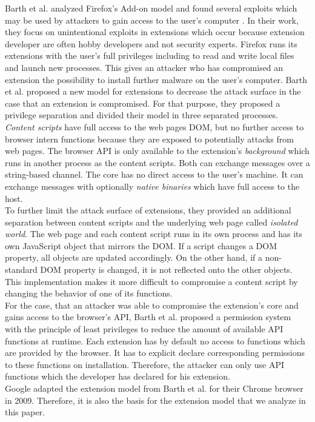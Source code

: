 	Barth et al. analyzed Firefox's Add-on model and found several exploits which may be used by attackers to gain access to the user's computer \cite{Barth10protectingbrowsers}. In their work, they focus on unintentional exploits in extensions which occur because extension developer are often hobby developers and not security experts. Firefox runs its extensions with the user's full privileges including to read and write local files and launch new processes. This gives an attacker who has compromised an extension the possibility to install further malware on the user's computer. Barth et al. proposed a new model for extensions to decrease the attack surface in the case that an extension is compromised. For that purpose, they  proposed a privilege separation and divided their model in three separated processes. \textit{Content scripts} have full access to the web pages DOM, but no further access to browser intern functions because they are exposed to potentially attacks from web pages. The browser API is only available to the extension's \textit{background} which runs in another process as the content scripts. Both can exchange messages over a string-based channel. The core has no direct access to the user's machine. It can exchange messages with optionally \textit{native binaries} which have full access to the host. \\
	To further limit the attack surface of extensions, they provided an additional separation between content scripts and the underlying web page called \textit{isolated world}. The web page and each content script runs in its own process and has its own JavaScript object that mirrors the DOM. If a script changes a DOM property, all objects are updated accordingly. On the other hand, if a non-standard DOM property is changed, it is not reflected onto the other objects. This implementation makes it more difficult to compromise a content script by changing the behavior of one of its functions. \\
	For the case, that an attacker was able to compromise the extension's core and gains access to the browser's API, Barth et al. proposed a permission system with the principle of least privileges to reduce the amount of available API functions at runtime. Each extension has by default no access to functions which are provided by the browser. It has to explicit declare corresponding permissions to these functions on installation. Therefore, the attacker can only use API functions which the developer has declared for his extension. \\
	Google adapted the extension model from Barth et al. for their Chrome browser in 2009. Therefore, it is also the basis for the extension model that we analyze in this paper.
	
